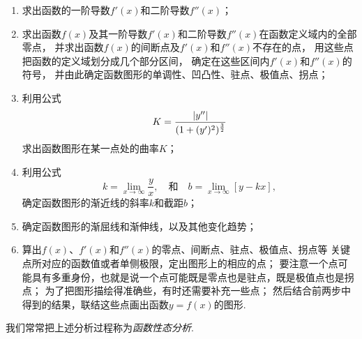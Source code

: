 \begin{enumerate}
	\item 求出函数的一阶导数\(f'(x)\)和二阶导数\(f''(x)\)；

	\item 求出函数\(f(x)\)及其一阶导数\(f'(x)\)和二阶导数\(f''(x)\)在函数定义域内的全部零点，
	并求出函数\(f(x)\)的间断点及\(f'(x)\)和\(f''(x)\)不存在的点，
	用这些点把函数的定义域划分成几个部分区间，
	确定在这些区间内\(f'(x)\)和\(f''(x)\)的符号，
	并由此确定函数图形的单调性、凹凸性、驻点、极值点、拐点；

	\item 利用公式\[
		K = \frac{\abs{y''}}{(1+(y')^2)^{\frac32}}
	\]求出函数图形在某一点处的曲率\(K\)；

	\item 利用公式\[
		k = \lim_{x\to\infty} \frac{y}{x},
		\quad\text{和}\quad
		b = \lim_{x\to\infty} \left[y - kx\right],
	\]确定函数图形的渐近线的斜率\(k\)和截距\(b\)；

	\item 确定函数图形的渐屈线和渐伸线，以及其他变化趋势；

	\item 算出\(f(x)\)、\(f'(x)\)和\(f''(x)\)的零点、间断点、驻点、极值点、拐点等
	关键点所对应的函数值或者单侧极限，定出图形上的相应的点；
	要注意一个点可能具有多重身份，也就是说一个点可能既是零点也是驻点，既是极值点也是拐点；
	为了把图形描绘得准确些，有时还需要补充一些点；
	然后结合前两步中得到的结果，联结这些点画出函数\(y=f(x)\)的图形.
\end{enumerate}
我们常常把上述分析过程称为\emph{函数性态分析}.

